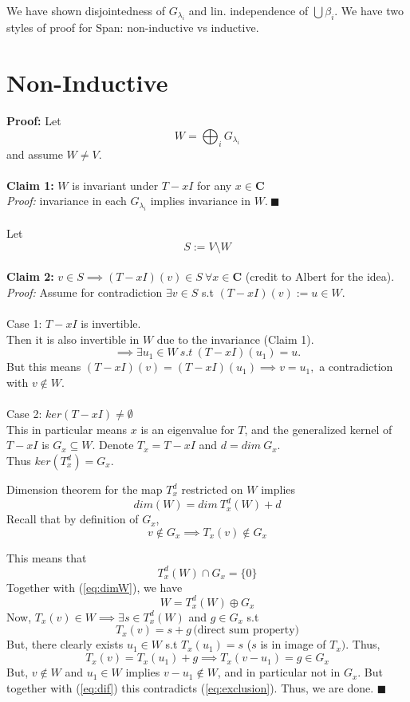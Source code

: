 \documentclass{article}
\begin{document}
We have shown disjointedness of $G_{\lambda_i}$ and lin. independence of $\bigcup \beta_i$. We have two styles of proof for Span: non-inductive vs inductive.

\section{Non-Inductive}
\textbf{Proof:} Let $$W=\bigoplus_i G_{\lambda_i}$$and assume $W\neq V$.\\ \\
\textbf{Claim 1:} $W$ is invariant under $T-xI$ for any $x\in\mathbf{C}$\\
\textit{Proof:} invariance in each $G_{\lambda_i}$ implies invariance in $W.\ \blacksquare$  \\ \\
Let $$S:=V\setminus W$$\\
\textbf{Claim 2:} $v\in S \implies (T-xI)(v)\in S \ \forall x\in \mathbf{C}$ (credit to Albert for the idea).\\
\textit{Proof:} Assume for contradiction $\exists v\in S$ s.t $(T-xI)
(v):=u\in W$.\\ \\
Case 1: $T-xI$ is invertible.\\
Then it is also invertible in $W$ due to the invariance (Claim 1). $$\implies \exists u_1 \in W \ s.t\ (T-xI)(u_1)=u.$$But this means $(T-xI)(v)=(T-xI)(u_1)\implies v=u_1,$ a contradiction with $v \notin W$.\\ \\
Case 2: $ker (T-xI)\neq \emptyset$\\
This in particular means $x$ is an eigenvalue for $T$, and the generalized kernel of $T-xI$ is $G_x\subseteq W$.
Denote $T_x=T-xI$ and $d=dim\ G_x$.\\
Thus $ker(T_x^d)=G_x$.

Dimension theorem for the map $T_x^d$ restricted on $W$ implies \begin{equation}
    \label{eq:dimW}
    dim(W)=dim\ T_x^d(W) +d
\end{equation}
Recall that by definition of $G_x$, 
\begin{equation}
    \label{eq:exclusion}
    v\notin G_x \implies T_x(v)\notin G_x
\end{equation}

This means that $$T_x^d(W)\cap G_x=\{0\}$$
Together with (\ref{eq:dimW}), we have
$$W=T_x^d(W) \oplus G_x$$
Now, $T_x(v)\in W \implies \exists s\in T_x^d(W)$ and $g\in G_x$ s.t
$$T_x(v)=s+g\,\textrm{(direct sum property)}$$
But, there clearly exists $u_1\in W$ s.t $T_x(u_1)=s$ ($s$ is in image of $T_x)$.
Thus, 
\begin{equation}
    \label{eq:dif}
    T_x(v)=T_x(u_1)+g\implies T_x(v-u_1)=g\in G_x
\end{equation}
But, $v\notin W$ and $u_1\in W$ implies $v-u_1\notin W$, and in particular not in $G_x$.
But together with (\ref{eq:dif}) this contradicts (\ref{eq:exclusion}).
Thus, we are done. $\blacksquare$
\end{document}
